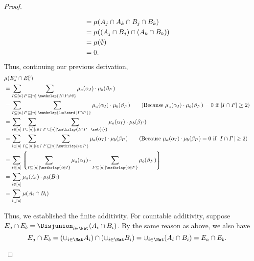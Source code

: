 \documentclass[acmsmall,nonacm,screen,appendix]{acmart}
\begin{document}
\begin{proof}
\begin{itemize}
\begin{align}
    &= \mu(A_j \cap A_k \cap B_j \cap B_k) \notag \\
    &= \mu((A_j\cap B_j) \cap (A_k \cap B_k)) \notag \\
    &= \mu(\emptyset) \notag \\
    &= 0. \notag
  \end{align}
Thus, continuing our previous derivation,
\begin{align}
   &\mu(E^n_a \cap E^n_b) \notag \\
   &= \sum_{I \subseteq [n]} \sum_{I' \subseteq [n] \mid \mathrlap{I \cap I' \neq \emptyset}}  \mu_a(\alpha_I) \cdot \mu_b (\beta_{I'}) \notag \\
   &= \sum_{I \subseteq [n]}
        \sum_{I' \subseteq [n] \mid \mathrlap{1 = \card{I \cap I'}}}
          \mu_a(\alpha_I) \cdot \mu_b (\beta_{I'})
   \tag{Because $\mu_{a}(\alpha_I) \cdot \mu_{b}(\beta_{I'})=0$ if $|I \cap I'| \geq 2$}\\
   &= \sum_{i \in [n]}
        \sum_{I \subseteq [n] \mid i \in I}
          \sum_{I' \subseteq [n] \mid \mathrlap{I \cap I' = \set{i}} }
            \mu_a(\alpha_I) \cdot \mu_b (\beta_{I'})
      \notag \\
   &= \sum_{i \in [n]} \sum_{I \subseteq [n] \mid i \in I} \sum_{I' \subseteq [n] \mid \mathrlap{i \in I'}}  \mu_a(\alpha_I) \cdot \mu_b (\beta_{I'})
   \tag{Because $\mu_{a}(\alpha_I) \cdot \mu_{b}(\beta_{I'})=0$ if $|I \cap I'| \geq 2$}\\
   &= \sum_{i \in [n]}
         \left\lgroup
         \sum_{I \subseteq [n] \mid \mathrlap{i \in I}} \mu_a(\alpha_I)
         \cdot
         \sum_{I' \subseteq [n] \mid \mathrlap{i \in I'}} \mu_b (\beta_{I'})
         \right\rgroup
     \notag \\
   &= \sum_{i \in [n]} \mu_a(A_i) \cdot \mu_b(B_i) \notag \\
   &= \sum_{i \in [n]} \mu(A_i \cap B_i) \notag
  \end{align}

  Thus, we established the finite additivity.
  For countable additivity, suppose $E_a \cap E_b = \Disjunion_{i \in \Nat}(A_i \cap B_i)$. By the same reason as above, we also have
  \[
    E_a \cap E_b = (\cup_{i \in \Nat} A_i) \cap (\cup_{i \in \Nat} B_i) = \cup_{i \in \Nat} (A_i \cap B_i) = E_a \cap E_b.
  \]



\end{itemize}
\end{proof}
\end{document}
